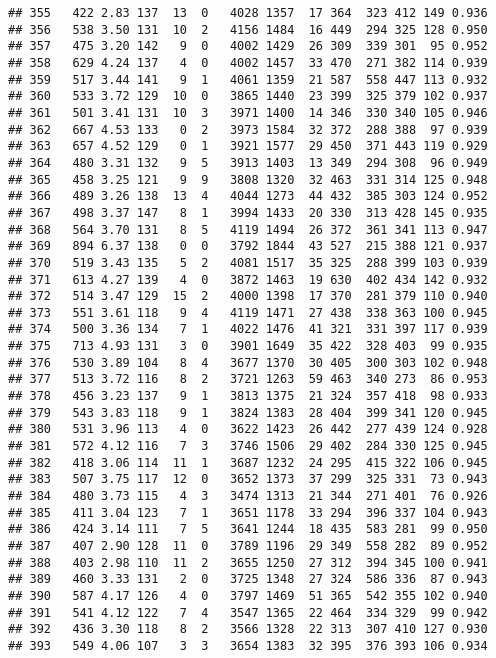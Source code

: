 \documentclass[]{article}
\begin{document}
\begin{verbatim}
## 355   422 2.83 137  13  0   4028 1357  17 364  323 412 149 0.936
## 356   538 3.50 131  10  2   4156 1484  16 449  294 325 128 0.950
## 357   475 3.20 142   9  0   4002 1429  26 309  339 301  95 0.952
## 358   629 4.24 137   4  0   4002 1457  33 470  271 382 114 0.939
## 359   517 3.44 141   9  1   4061 1359  21 587  558 447 113 0.932
## 360   533 3.72 129  10  0   3865 1440  23 399  325 379 102 0.937
## 361   501 3.41 131  10  3   3971 1400  14 346  330 340 105 0.946
## 362   667 4.53 133   0  2   3973 1584  32 372  288 388  97 0.939
## 363   657 4.52 129   0  1   3921 1577  29 450  371 443 119 0.929
## 364   480 3.31 132   9  5   3913 1403  13 349  294 308  96 0.949
## 365   458 3.25 121   9  9   3808 1320  32 463  331 314 125 0.948
## 366   489 3.26 138  13  4   4044 1273  44 432  385 303 124 0.952
## 367   498 3.37 147   8  1   3994 1433  20 330  313 428 145 0.935
## 368   564 3.70 131   8  5   4119 1494  26 372  361 341 113 0.947
## 369   894 6.37 138   0  0   3792 1844  43 527  215 388 121 0.937
## 370   519 3.43 135   5  2   4081 1517  35 325  288 399 103 0.939
## 371   613 4.27 139   4  0   3872 1463  19 630  402 434 142 0.932
## 372   514 3.47 129  15  2   4000 1398  17 370  281 379 110 0.940
## 373   551 3.61 118   9  4   4119 1471  27 438  338 363 100 0.945
## 374   500 3.36 134   7  1   4022 1476  41 321  331 397 117 0.939
## 375   713 4.93 131   3  0   3901 1649  35 422  328 403  99 0.935
## 376   530 3.89 104   8  4   3677 1370  30 405  300 303 102 0.948
## 377   513 3.72 116   8  2   3721 1263  59 463  340 273  86 0.953
## 378   456 3.23 137   9  1   3813 1375  21 324  357 418  98 0.933
## 379   543 3.83 118   9  1   3824 1383  28 404  399 341 120 0.945
## 380   531 3.96 113   4  0   3622 1423  26 442  277 439 124 0.928
## 381   572 4.12 116   7  3   3746 1506  29 402  284 330 125 0.945
## 382   418 3.06 114  11  1   3687 1232  24 295  415 322 106 0.945
## 383   507 3.75 117  12  0   3652 1373  37 299  325 331  73 0.943
## 384   480 3.73 115   4  3   3474 1313  21 344  271 401  76 0.926
## 385   411 3.04 123   7  1   3651 1178  33 294  396 337 104 0.943
## 386   424 3.14 111   7  5   3641 1244  18 435  583 281  99 0.950
## 387   407 2.90 128  11  0   3789 1196  29 349  558 282  89 0.952
## 388   403 2.98 110  11  2   3655 1250  27 312  394 345 100 0.941
## 389   460 3.33 131   2  0   3725 1348  27 324  586 336  87 0.943
## 390   587 4.17 126   4  0   3797 1469  51 365  542 355 102 0.940
## 391   541 4.12 122   7  4   3547 1365  22 464  334 329  99 0.942
## 392   436 3.30 118   8  2   3566 1328  22 313  307 410 127 0.930
## 393   549 4.06 107   3  3   3654 1383  32 395  376 393 106 0.934

\end{verbatim}
\end{document}

